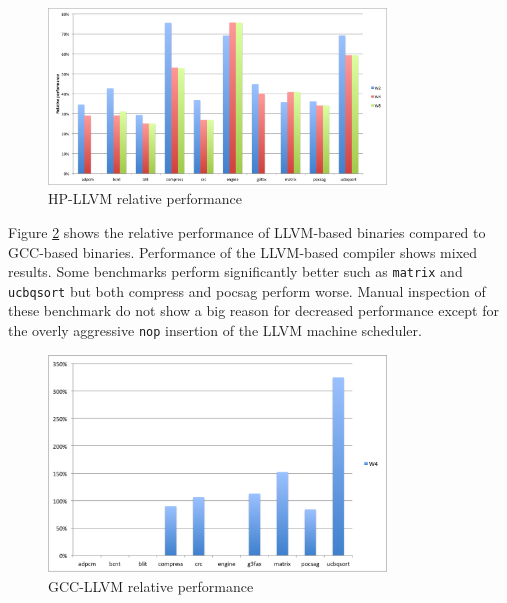 \begin{figure}[ht]
\centering
\includegraphics[width=0.8\textwidth]{5_results/img/rel_HP.png}
\caption{HP-LLVM relative performance}
\label{fig:rel_HP}
\end{figure}

Figure \ref{fig:rel_GCC} shows the relative performance of LLVM-based binaries compared to GCC-based binaries. Performance of the LLVM-based compiler shows mixed results. Some benchmarks perform significantly better such as \texttt{matrix} and \texttt{ucbqsort} but both compress and pocsag perform worse. Manual inspection of these benchmark do not show a big reason for decreased performance except for the overly aggressive \texttt{nop} insertion of the LLVM machine scheduler.

\begin{figure}[ht]
\centering
\includegraphics[width=0.8\textwidth]{5_results/img/rel_GCC.png}
\caption{GCC-LLVM relative performance}
\label{fig:rel_GCC}
\end{figure}



